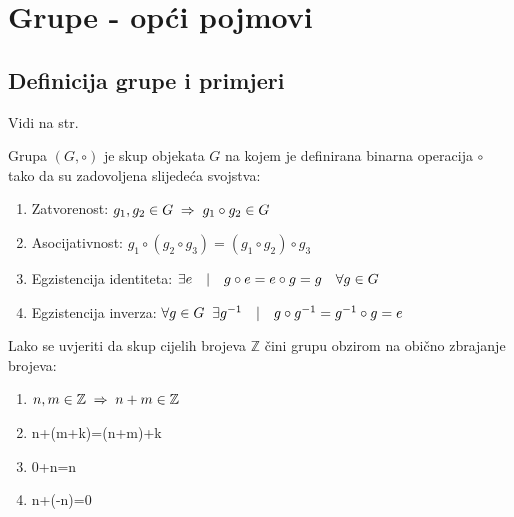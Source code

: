 
\chapter{Grupe - opći pojmovi}

\section{Definicija grupe i primjeri}

Vidi na str. \pageref{id:5}

\begin{definicija}[Grupa] 
Grupa $(G,\circ)$ je skup objekata $G$ na kojem je definirana binarna operacija
 $\circ$ tako da su zadovoljena slijedeća svojstva:
\begin{enumerate}[1)]
\item Zatvorenost: $g_1, g_2 \in G \;\Rightarrow\; g_1 \circ g_2 \in G$
\item Asocijativnost: $ g_1 \circ (g_2 \circ g_3) =
                       (g_1 \circ  g_2)\circ g_3$
\item Egzistencija identiteta: 
    $\exists e \quad | \quad g\circ e = e \circ g = g \quad \forall g\in G$
\item Egzistencija inverza: 
  $\forall g\in G \;\; \exists g^{-1} \quad | \quad g\circ g^{-1} = g^{-1}\circ
g =e$
\end{enumerate}
\end{definicija}


\begin{primjer}[$\mathbb{Z}$, +]
 Lako se uvjeriti da skup cijelih brojeva $\mathbb{Z}$ čini grupu obzirom
 na obično zbrajanje brojeva:
\begin{enumerate}[1)]
\item $n,m \in  \mathbb{Z} \;\Rightarrow\; n+m \in  \mathbb{Z}$
\item n+(m+k)=(n+m)+k
\item 0+n=n \quad {}
\item n+(-n)=0
\end{enumerate}
\end{primjer}

